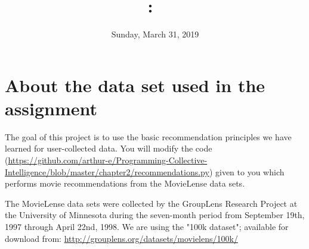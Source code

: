 \documentclass{article}
\title{
\vspace{2in}
\textmd{\textbf{\hmwkClass:\ \hmwkTitle}}\\
\vspace{0.1in}\large{\textit{\hmwkClassInstructor}}
\vspace{3in}
}
\author{\textbf{\hmwkAuthorName}}
\date{Sunday, March 31, 2019} %
\begin{document}
\maketitle





\newpage
\tableofcontents
\newpage

\section{About the data set used in the assignment}
The goal of this project is to use the basic recommendation principles we have learned for user-collected data. You will modify the code (\url{https://github.com/arthur-e/Programming-Collective-Intelligence/blob/master/chapter2/recommendations.py}) 
given to you which performs movie recommendations from the MovieLense data sets.

The MovieLense data sets were collected by the GroupLens Research Project at the University of Minnesota during the seven-month period from September 19th, 1997 through April 22nd, 1998.  We are using the "100k dataset"; available for download from:
\url{http://grouplens.org/datasets/movielens/100k/}
\end{document}

